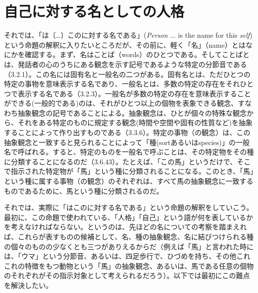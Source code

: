 \documentclass[a4j,oneside]{jsbook}
\begin{document}
\section{
自己に対する名としての人格
}
それでは、「は〔…〕このに対する名である」({\itshape Person} ... is the name for this {\itshape self})という命題の解釈に入りたいところだが、その前に、軽く「名」（name）とはなにかを確認する。まず、名はことば（words）のひとつである。そしてことばとは、発話者の心のうちにある観念を示す記号であるような特定の分節音である（3.2.1）。この名には固有名と一般名の二つがある。固有名とは、ただひとつの特定の事物を意味表示する名であり、一般名とは、多数の特定の存在をそれひとつで表示する名である（3.2.3）。一般名が多数の特定の存在を意味表示することができる(一般的である)のは、それがひとつ以上の個物を表象できる観念、すなわち抽象観念の記号であることによる。抽象観念は、ひとが個々の特殊な観念から、それをある特定のものに規定する観念(時間や空間や固有の性質など)を抽象することによって作り出すものである（3.3.6）。特定の事物（の観念）は、この抽象観念と一致すると見られることによって「種(sortあるいはspecies)」の一般名で呼ばれる。すると、特定のものを一般名で呼ぶことは、その特定物をその種に分類することになるのだ（3.6.43）。たとえば、「この馬」というだけで、そこで指示された特定物が「馬」という種に分類されることになる。このとき、「馬」という種に属する事物（の観念）のそれぞれは、すべて馬の抽象観念に一致するものであるために、馬という種に分類されるのだ。
\par
それでは、実際に「はこのに対する名である」という命題の解釈をしていこう。最初に、この命題で使われている、「人格」「自己」という語が何を表しているかを考えなければならない。というのは、先ほどの名についての考察を踏まえれば、これらが表すものの候補として、名、種の抽象観念、名に結びつけられる種の個々のものの少なくとも三つがありえるからだ（例えば「馬」と言われた時には、「ウマ」という分節音、あるいは、四足歩行で、ひづめを持ち、その他これこれの特徴をもつ動物という「馬」の抽象観念、あるいは、馬である任意の個物のそれぞれがその指示対象として考えられるだろう）。以下では最初にこの難点を解決したい。
\par
\end{document}
